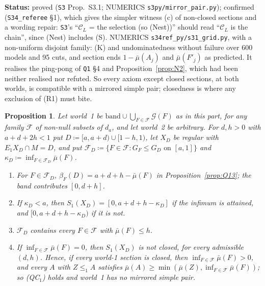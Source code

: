 \documentclass[11pt]{article}
\newtheorem{proposition}[theorem]{Proposition}
\theoremstyle{definition}
\theoremstyle{remark}
\newcommand{\C}{\mathcal C}
\newcommand{\src}[1]{\texttt{#1}}
\newcommand{\status}[1]{\par\smallskip\noindent\textbf{Status:} #1\par\smallskip}
\begin{document}
\status{proved (\src{S3} Prop.~S3.1; NUMERICS \src{s3py/mirror\_pair.py}); confirmed (\src{S34\_referee} \S1), which gives the simpler witness (c) of non-closed sections and a wording repair: \src{S3}'s ``$\C_L$ = the selection (so (Nest))'' should read ``$\C_L$ is the chain'', since (Nest) includes (S). NUMERICS \src{s34ref\_py/s31\_grid.py}, with a non-uniform disjoint family: (K) and undominatedness without failure over 600 models and 95 cuts, and section ends $1-\bar\mu(A_j)$ and $\bar\mu(F'_j)$ as predicted. It realises the ping-pong of \src{Q1} \S4 and Proposition~\ref{prop:N2}, which had been neither realised nor refuted. So every axiom except closed sections, at both worlds, is compatible with a mirrored simple pair; closedness is where any exclusion of (R1) must bite.}

\begin{proposition}\label{prop:S32}
Let world~1 be $\mathrm{band}\cup\bigcup_{F\in\mathcal F}\mathcal G(F)$ as in this part, for any family $\mathcal F$ of non-null subsets of $d_a$, and let world~2 be arbitrary. For $d,h>0$ with $a+d+2h<1$ put $D\coloneqq[a,a+d)\cup[1-h,1)$, let $X_D$ be regular with $E_1X_D\cap M=D$, and put $\mathcal F_D\coloneqq\{F\in\mathcal F:G_F\le G_D\text{ on }[a,1]\}$ and $\kappa_D\coloneqq\inf_{F\in\mathcal F_D}\bar\mu(F)$.
\begin{enumerate}[leftmargin=*,label=(\alph*)]
\item For $F\in\mathcal F_D$, $\beta_F(D)=a+d+h-\bar\mu(F)$ in Proposition~\ref{prop:Q13}; the band contributes $[0,d+h]$.
\item If $\kappa_D<a$, then $S_1(X_D)=[0,a+d+h-\kappa_D]$ if the infimum is attained, and $[0,a+d+h-\kappa_D)$ if it is not.
\item $\mathcal F_D$ contains every $F\in\mathcal F$ with $\bar\mu(F)\le h$.
\item If $\inf_{F\in\mathcal F}\bar\mu(F)=0$, then $S_1(X_D)$ is not closed, for every admissible $(d,h)$. Hence, if every world-1 section is closed, then $\inf_{F\in\mathcal F}\bar\mu(F)>0$, and every $A$ with $Z\le_1A$ satisfies $\bar\mu(A)\ge\min(\bar\mu(Z),\inf_{F\in\mathcal F}\bar\mu(F))$; so (QC$_1$) holds and world~1 has no mirrored simple pair.
\end{enumerate}
\end{proposition}
\end{document}
